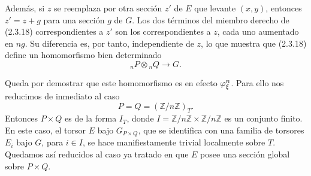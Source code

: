 Además, si $z$ se reemplaza por otra sección $z'$ de $E$ que levante
$(x,y)$, entonces $z'=z+g$ para una sección $g$ de $G$. Los dos
términos del miembro derecho de (2.3.18) correspondientes a $z'$ son
los correspondientes a $z$, cada uno aumentado en $ng$. Su diferencia
es, por tanto, independiente de $z$, lo que muestra que (2.3.18)
define un homomorfismo bien determinado
\[
 {}_nP\otimes{}_nQ\longrightarrow G.
\]

Queda por demostrar que este homomorfismo es en efecto
$\sisi{\varphi^n}{\varphi_\xi^n}$. Para ello nos reducimos de inmediato
al caso
\[
 P=Q=(\mathbb Z/n\mathbb Z)_T.
\]
Entonces $P\times Q$ es de la forma $I_T$, donde
$I=\mathbb Z/n\mathbb Z\times\mathbb Z/n\mathbb Z$ es un conjunto
finito. En este caso, el torsor $E$ bajo $G_{P\times Q}$, que se
identifica con una familia de torsores $E_i$ bajo $G$, para $i\in I$,
se hace manifiestamente trivial localmente sobre $T$. Quedamos así
reducidos al caso ya tratado en que $E$ posee una sección global sobre
$P\times Q$.
